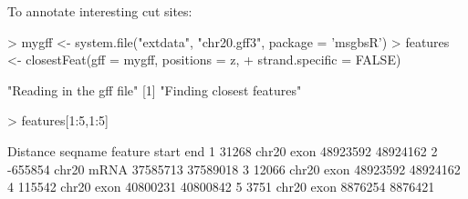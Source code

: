 \documentclass{article}
\begin{document}
To annotate interesting cut sites:
\begin{Schunk}
\begin{Sinput}
> mygff <- system.file("extdata", "chr20.gff3", package = 'msgbsR')
> features <- closestFeat(gff = mygff, positions = z,
+                         strand.specific = FALSE)
\end{Sinput}
\begin{Soutput}
[1] "Reading in the gff file"
[1] "Finding closest features"
\end{Soutput}
\begin{Sinput}
> features[1:5,1:5]
\end{Sinput}
\begin{Soutput}
  Distance seqname feature    start      end
1    31268   chr20    exon 48923592 48924162
2  -655854   chr20    mRNA 37585713 37589018
3    12066   chr20    exon 48923592 48924162
4   115542   chr20    exon 40800231 40800842
5     3751   chr20    exon  8876254  8876421
\end{Soutput}
\end{Schunk}
\end{document}
